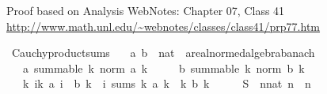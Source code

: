 \begin{isabellebody}
%
\endisatagproof
{\isafoldproof}%
%
\isadelimproof
%
\endisadelimproof
%
\isadelimdocument
%
\endisadelimdocument
%
\isatagdocument
%
\isamarkuptrue%
%
\endisatagdocument
{\isafolddocument}%
%
\isadelimdocument
%
\endisadelimdocument
%
\begin{isamarkuptext}%
Proof based on Analysis WebNotes: Chapter 07, Class 41
  \url{http://www.math.unl.edu/~webnotes/classes/class41/prp77.htm}%
\end{isamarkuptext}\isamarkuptrue%
\isamarkupfalse%
\ Cauchy{\isacharunderscore}{\kern0pt}product{\isacharunderscore}{\kern0pt}sums{\isacharcolon}{\kern0pt}\isanewline
\ \ \ a\ b\ {\isacharcolon}{\kern0pt}{\isacharcolon}{\kern0pt}\ {\isachardoublequoteopen}nat\ {\isasymRightarrow}\ {\isacharprime}{\kern0pt}a{\isacharcolon}{\kern0pt}{\isacharcolon}{\kern0pt}{\isacharbraceleft}{\kern0pt}real{\isacharunderscore}{\kern0pt}normed{\isacharunderscore}{\kern0pt}algebra{\isacharcomma}{\kern0pt}banach{\isacharbraceright}{\kern0pt}{\isachardoublequoteclose}\isanewline
\ \ \ a{\isacharcolon}{\kern0pt}\ {\isachardoublequoteopen}summable\ {\isacharparenleft}{\kern0pt}{\isasymlambda}k{\isachardot}{\kern0pt}\ norm\ {\isacharparenleft}{\kern0pt}a\ k{\isacharparenright}{\kern0pt}{\isacharparenright}{\kern0pt}{\isachardoublequoteclose}\isanewline
\ \ \ \ \ b{\isacharcolon}{\kern0pt}\ {\isachardoublequoteopen}summable\ {\isacharparenleft}{\kern0pt}{\isasymlambda}k{\isachardot}{\kern0pt}\ norm\ {\isacharparenleft}{\kern0pt}b\ k{\isacharparenright}{\kern0pt}{\isacharparenright}{\kern0pt}{\isachardoublequoteclose}\isanewline
\ \ \ {\isachardoublequoteopen}{\isacharparenleft}{\kern0pt}{\isasymlambda}k{\isachardot}{\kern0pt}\ {\isasymSum}i{\isasymle}k{\isachardot}{\kern0pt}\ a\ i\ {\isacharasterisk}{\kern0pt}\ b\ {\isacharparenleft}{\kern0pt}k\ {\isacharminus}{\kern0pt}\ i{\isacharparenright}{\kern0pt}{\isacharparenright}{\kern0pt}\ sums\ {\isacharparenleft}{\kern0pt}{\isacharparenleft}{\kern0pt}{\isasymSum}k{\isachardot}{\kern0pt}\ a\ k{\isacharparenright}{\kern0pt}\ {\isacharasterisk}{\kern0pt}\ {\isacharparenleft}{\kern0pt}{\isasymSum}k{\isachardot}{\kern0pt}\ b\ k{\isacharparenright}{\kern0pt}{\isacharparenright}{\kern0pt}{\isachardoublequoteclose}\isanewline
%
\isadelimproof
%
\endisadelimproof
%
\isatagproof
{}\isamarkupfalse%
\ {\isacharminus}{\kern0pt}\isanewline
\ \ \isamarkupfalse%
\ {\isacharquery}{\kern0pt}S{}\ {\isacharequal}{\kern0pt}\ {\isachardoublequoteopen}{\isasymlambda}n{\isacharcolon}{\kern0pt}{\isacharcolon}{\kern0pt}nat{\isachardot}{\kern0pt}\ {\isacharbraceleft}{\kern0pt}{\isachardot}{\kern0pt}{\isachardot}{\kern0pt}{\isacharless}{\kern0pt}n{\isacharbraceright}{\kern0pt}\ {\isasymtimes}\ {\isacharbraceleft}{\kern0pt}{\isachardot}{\kern0pt}{\isachardot}{\kern0pt}{\isacharless}{\kern0pt}n{\isacharbraceright}{\kern0pt}{\isachardoublequoteclose}\isanewline

\end{isabellebody}
